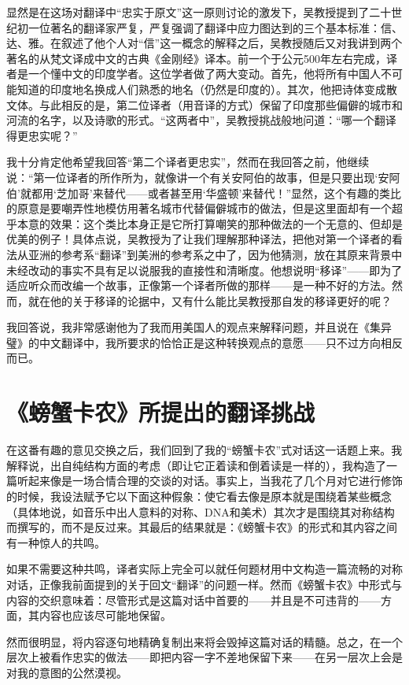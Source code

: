 显然是在这场对翻译中“忠实于原文”这一原则讨论的激发下，吴教授提到了二十世纪初一位著名的翻译家严复，严复强调了翻译中应力图达到的三个基本标准：信、达、雅。在叙述了他个人对“信”这一概念的解释之后，吴教授随后又对我讲到两个著名的从梵文译成中文的古典《金刚经》译本。前一个于公元500年左右完成，译者是一个懂中文的印度学者。这位学者做了两大变动。首先，他将所有中国人不可能知道的印度地名换成人们熟悉的地名（仍然是印度的）。其次，他把诗体变成散文体。与此相反的是，第二位译者（用音译的方式）保留了印度那些偏僻的城市和河流的名字，以及诗歌的形式。“这两者中”，吴教授挑战般地问道：“哪一个翻译得更忠实呢？”

我十分肯定他希望我回答“第二个译者更忠实”，然而在我回答之前，他继续说：“第一位译者的所作所为，就像讲一个有关安阿伯的故事，但是只要出现‘安阿伯’就都用‘芝加哥’来替代——或者甚至用‘华盛顿’来替代！”显然，这个有趣的类比的原意是要嘲弄性地模仿用著名城市代替偏僻城市的做法，但是这里面却有一个超乎本意的效果：这个类比本身正是它所打算嘲笑的那种做法的一个无意的、但却是优美的例子！具体点说，吴教授为了让我们理解那种译法，把他对第一个译者的看法从亚洲的参考系“翻译”到美洲的参考系之中了，因为他猜测，放在其原来背景中未经改动的事实不具有足以说服我的直接性和清晰度。他想说明“移译”——即为了适应听众而改编一个故事，正像第一个译者所做的那样——是一种不好的方法。然而，就在他的关于移译的论据中，又有什么能比吴教授那自发的移译更好的呢？

我回答说，我非常感谢他为了我而用美国人的观点来解释问题，并且说在《集异璧》的中文翻译中，我所要求的恰恰正是这种转换观点的意愿——只不过方向相反而已。

\section*{《螃蟹卡农》所提出的翻译挑战}

在这番有趣的意见交换之后，我们回到了我的“螃蟹卡农”式对话这一话题上来。我解释说，出自纯结构方面的考虑（即让它正着读和倒着读是一样的），我构造了一篇听起来像是一场合情合理的交谈的对话。事实上，当我花了几个月对它进行修饰的时候，我设法赋予它以下面这种假象：使它看去像是原本就是围绕着某些概念（具体地说，如音乐中出人意料的对称、DNA和美术）其次才是围绕其对称结构而撰写的，而不是反过来。其最后的结果就是：《螃蟹卡农》的形式和其内容之间有一种惊人的共鸣。

如果不需要这种共鸣，译者实际上完全可以就任何题材用中文构造一篇流畅的对称对话，正像我前面提到的关于回文“翻译”的问题一样。然而《螃蟹卡农》中形式与内容的交织意味着：尽管形式是这篇对话中首要的——并且是不可违背的——方面，其内容也应该尽可能地保留。

然而很明显，将内容逐句地精确复制出来将会毁掉这篇对话的精髓。总之，在一个层次上被看作忠实的做法——即把内容一字不差地保留下来——在另一层次上会是对我的意图的公然漠视。

